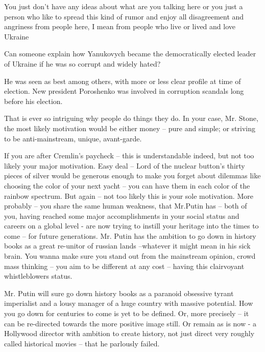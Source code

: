\begin{itemize}
You just don’t have any ideas about what are you talking here or you just a
person who like to spread this kind of rumor and enjoy all disagreement and
angriness from people here, I mean from people who live or lived and love
Ukraine


Can someone explain how Yanukovych became the democratically elected leader of
Ukraine if he was so corrupt and widely hated?

\begin{itemize} %

He was seen as best among others, with more or less clear profile at time of
election. New president Poroshenko was involved in corruption scandals long
before his election.

\end{itemize} %


That is ever so intriguing why people do things they do. In your case, Mr.
Stone, the most likely motivation would be either money – pure and simple; or
striving to be anti-mainstream, unique, avant-garde.

If you are after Cremlin’s paycheck – this is understandable indeed, but not
too likely your major motivation. Easy deal – Lord of the nuclear button’s
thirty pieces of silver would be generous enough to make you forget about
dilemmas like choosing the color of your next yacht – you can have them in each
color of the rainbow spectrum. But again – not too likely this is your sole
motivation. More probably – you share the same human weakness, that Mr.Putin
has – both of you, having reached some major accomplishments in your social
status and careers on a global level - are now trying to instill your heritage
into the times to come – for future generations. Mr. Putin has the ambition to
go down in history books as a great re-unitor of russian lands –whatever it
might mean in his sick brain. You wanna make sure you stand out from the
mainstream opinion, crowd mass thinking – you aim to be different at any cost –
having this clairvoyant whistleblowers status.

Mr. Putin will sure go down history books as a paranoid obsessive tyrant
imperialist and a lousy manager of a huge country with massive potential. How
you go down for centuries to come is yet to be defined. Or, more precisely – it
can be re-directed towards the more positive image still. Or remain as is now -
a Hollywood director with ambition to create history, not just direct very
roughly called historical movies – that he parlously failed.


\end{itemize}
